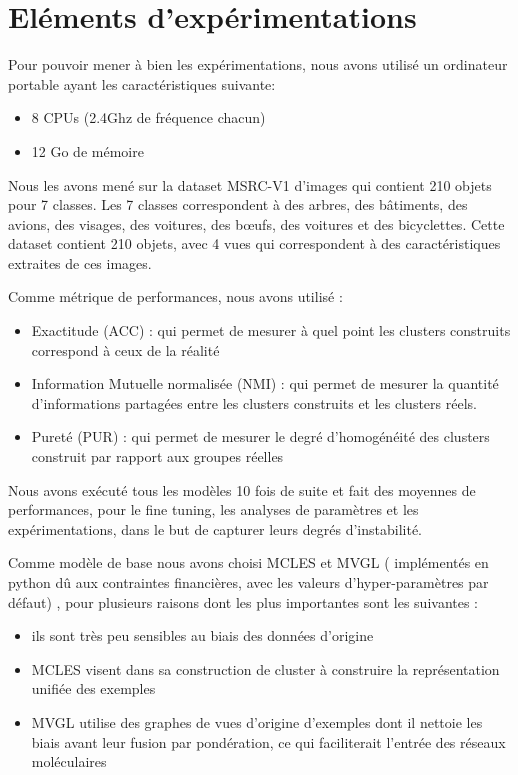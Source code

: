\documentclass[12pt,a4paper]{report}
\begin{document}
	\section{Eléments d'expérimentations}
	Pour pouvoir mener à bien les expérimentations, nous avons utilisé un ordinateur portable ayant les caractéristiques suivante:
    
	\begin{itemize}
    	\item 8 CPUs (2.4Ghz de fréquence chacun)
    	\item 12 Go de mémoire
	\end{itemize}
    
	Nous les avons mené sur la dataset MSRC-V1 d'images qui contient 210 objets pour 7 classes. Les 7 classes correspondent à des arbres, des bâtiments, des avions, des visages, des voitures, des bœufs, des voitures et des bicyclettes. Cette dataset contient 210 objets, avec 4 vues qui correspondent à des caractéristiques extraites de ces images.

 	Comme métrique de performances, nous avons utilisé :
	\begin{itemize}
    	\item Exactitude (ACC) : qui permet de mesurer à quel point les clusters construits correspond à ceux de la réalité
    	\item Information Mutuelle normalisée (NMI) : qui permet de mesurer la quantité d'informations partagées entre les clusters construits et les clusters réels.
    	\item Pureté (PUR) : qui permet de mesurer le degré d'homogénéité des clusters construit par rapport aux groupes réelles
	\end{itemize}

	Nous avons exécuté tous les modèles 10 fois de suite et fait des moyennes de performances, pour le fine tuning, les analyses de paramètres et les expérimentations, dans le but de capturer leurs degrés d'instabilité.
    
	Comme modèle de base nous avons choisi MCLES et MVGL ( implémentés en python dû aux contraintes financières, avec les valeurs d’hyper-paramètres par défaut) , pour plusieurs raisons dont les plus importantes sont les suivantes :
	\begin{itemize}
    	\item ils sont très peu sensibles au biais des données d'origine
    	\item MCLES visent dans sa construction de cluster à construire la représentation unifiée des exemples
    	\item MVGL utilise des graphes de vues d'origine d'exemples dont il nettoie les biais avant leur fusion par pondération, ce qui faciliterait l'entrée des réseaux moléculaires
	\end{itemize}
    
\end{document}
